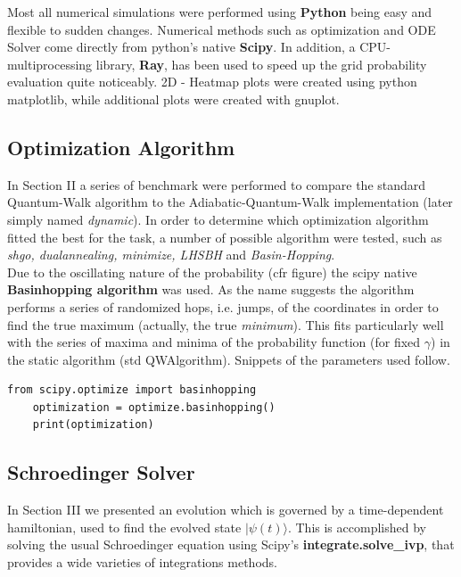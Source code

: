 \documentclass[aps,pra,reprint, onecolumn]{revtex4-2}
\begin{document}
Most all numerical simulations were performed using \textbf{Python} being easy and flexible to sudden changes. Numerical methods such as optimization and ODE Solver come directly from python's native \textbf{Scipy}. In addition, a CPU-multiprocessing library, \textbf{Ray}, has been used to speed up the grid probability evaluation quite noticeably. 2D - Heatmap plots were created using python matplotlib, while additional plots were created with gnuplot.

\subsection{Optimization Algorithm}
In Section II a series of benchmark were performed to compare the standard Quantum-Walk algorithm to the Adiabatic-Quantum-Walk implementation (later simply named \textit{dynamic}). In order to determine which optimization algorithm fitted the best for the task, a number of possible algorithm were tested, such as \textit{shgo, dualannealing, minimize, LHSBH} and \textit{Basin-Hopping}. \\

Due to the oscillating nature of the probability (cfr figure) the scipy native \textbf{Basinhopping algorithm} was used. As the name suggests the algorithm performs a series of randomized hops, i.e. jumps, of the coordinates in order to find the true maximum (actually, the true \textit{minimum}). This fits particularly well with the series of maxima and minima of the probability function (for fixed $\gamma$) in the static algorithm (std QWAlgorithm). Snippets of the parameters used follow.

\begin{lstlisting}[xleftmargin=0cm]
	from scipy.optimize import basinhopping
	optimization = optimize.basinhopping()
	print(optimization)
\end{lstlisting}

\subsection{Schroedinger Solver}
In Section III we presented an evolution which is governed by a time-dependent hamiltonian, used to find the evolved state $|\psi(t)\rangle$. This is accomplished by solving the usual Schroedinger equation using Scipy's \textbf{integrate.solve\_ivp}, that provides a wide varieties of integrations methods. \\
\end{document}
